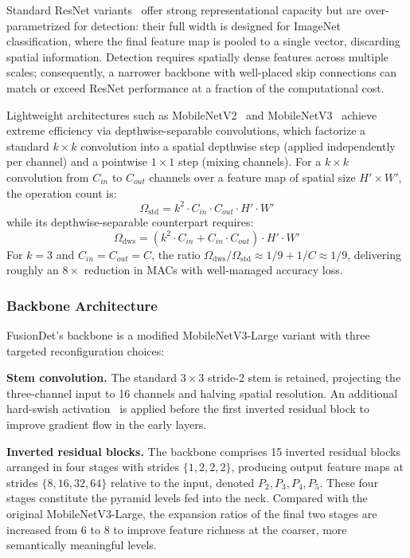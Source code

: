 Standard ResNet variants~\cite{he2016deep} offer strong
representational capacity but are over-parametrized for
detection: their full width is designed for ImageNet
classification, where the final feature map is pooled to a
single vector, discarding spatial information.  Detection
requires spatially dense features across multiple scales;
consequently, a narrower backbone with well-placed skip
connections can match or exceed ResNet performance at a
fraction of the computational cost.

Lightweight architectures such as
MobileNetV2~\cite{sandler2018mobilenetv2} and
MobileNetV3~\cite{howard2019searching} achieve extreme
efficiency via depthwise-separable convolutions, which
factorize a standard $k \times k$ convolution into a spatial
depthwise step (applied independently per channel) and a
pointwise $1 \times 1$ step (mixing channels).  For a $k
\times k$ convolution from $C_{in}$ to $C_{out}$ channels over
a feature map of spatial size $H' \times W'$, the operation
count is:
\begin{equation}
    \Omega_{\text{std}} =
    k^2 \cdot C_{in} \cdot C_{out} \cdot H' \cdot W'
    \label{eq:std_conv}
\end{equation}
while its depthwise-separable counterpart requires:
\begin{equation}
    \Omega_{\text{dws}} =
    \left(k^2 \cdot C_{in} + C_{in} \cdot C_{out}\right)
    \cdot H' \cdot W'
    \label{eq:dws_conv}
\end{equation}
For $k = 3$ and $C_{in} = C_{out} = C$, the ratio
$\Omega_{\text{dws}} / \Omega_{\text{std}} \approx 1/9 +
1/C \approx 1/9$, delivering roughly an $8\times$ reduction in
MACs with well-managed accuracy loss.

\subsubsection{Backbone Architecture}

FusionDet's backbone is a modified MobileNetV3-Large variant
with three targeted reconfiguration choices:

\textbf{Stem convolution.}  The standard $3\times3$ stride-2
stem is retained, projecting the three-channel input to 16
channels and halving spatial resolution.  An additional
hard-swish activation~\cite{howard2019searching} is applied
before the first inverted residual block to improve gradient
flow in the early layers.

\textbf{Inverted residual blocks.}  The backbone comprises 15
inverted residual blocks arranged in four stages with strides
$\{1, 2, 2, 2\}$, producing output feature maps at strides
$\{8, 16, 32, 64\}$ relative to the input, denoted $P_2, P_3,
P_4, P_5$.  These four stages constitute the pyramid levels
fed into the neck.  Compared with the original MobileNetV3-Large,
the expansion ratios of the final two stages are increased from
6 to 8 to improve feature richness at the coarser, more
semantically meaningful levels.

